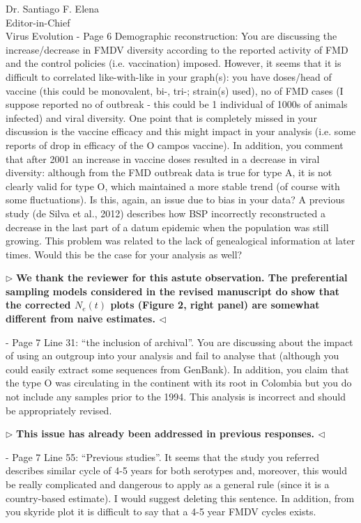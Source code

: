 \documentclass[12pt, a4paper]{letter} %
\newenvironment{reply}{$\triangleright$\bf}{$\triangleleft$}
\begin{document}
\begin{letter}{
	Dr. Santiago F. Elena\\
    Editor-in-Chief \\
    Virus Evolution
}
-       Page 6 Demographic reconstruction: You are discussing the increase/decrease in FMDV diversity according to the reported activity of FMD and the control policies (i.e. vaccination) imposed. 
However, it seems that it is difficult to correlated like-with-like in your graph(s): you have doses/head of vaccine (this could be monovalent, bi-, tri-; strain(s) used), no of FMD cases (I suppose reported no of outbreak - this could be 1 individual of 1000s of animals infected) and viral diversity. 
One point that is completely missed in your discussion is the vaccine efficacy and this might impact in your analysis (i.e. some reports of drop in efficacy of the O campos vaccine). 
In addition, you comment that after 2001 an increase in vaccine doses resulted in a decrease in viral diversity: although from the FMD outbreak data is true for type A, it is not clearly valid for type O, which maintained a more stable trend (of course with some fluctuations). 
Is this, again, an issue due to bias in your data? A previous study (de Silva et al., 2012) describes how BSP incorrectly reconstructed a decrease in the last part of a datum epidemic when the population was still growing. 
This problem was related to the lack of genealogical information at later times. Would this be the case for your analysis as well?

\begin{reply}
We thank the reviewer for this astute observation.
The preferential sampling models considered in the revised manuscript do show that the corrected $N_e(t)$ plots (Figure 2, right panel) are somewhat different from naive estimates.
\end{reply}

-       Page 7 Line 31: ``the inclusion of archival''. 
You are discussing about the impact of using an outgroup into your analysis and fail to analyse that (although you could easily extract some sequences from GenBank). 
In addition, you claim that the type O was circulating in the continent with its root in Colombia but you do not include any samples prior to the 1994. 
This analysis is incorrect and should be appropriately revised.

\begin{reply}
This issue has already been addressed in previous responses.
\end{reply}

-       Page 7 Line 55: ``Previous studies''. 
It seems that the study you referred describes similar cycle of 4-5 years for both serotypes and, moreover, this would be really complicated and dangerous to apply as a general rule (since it is a country-based estimate). 
I would suggest deleting this sentence. In addition, from you skyride plot it is difficult to say that a 4-5 year FMDV cycles exists.


\end{letter}
\end{document}
